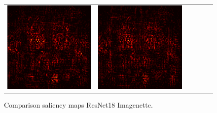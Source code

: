 \documentclass[preprint,12pt]{elsarticle}
\begin{document}
\begin{figure}[p]
\begin{tabular}{cccccc}
  \includegraphics[scale=\scale]{../visualizations/examples/imagenette/resnet18/active_saliency_map/9.png} & 
  \includegraphics[scale=\scale]{../visualizations/examples/imagenette/resnet18/inactive_saliency_map/9.png} \\
  \end{tabular}
  \caption{Comparison saliency maps ResNet18 Imagenette.}
\end{figure}
\end{document}
